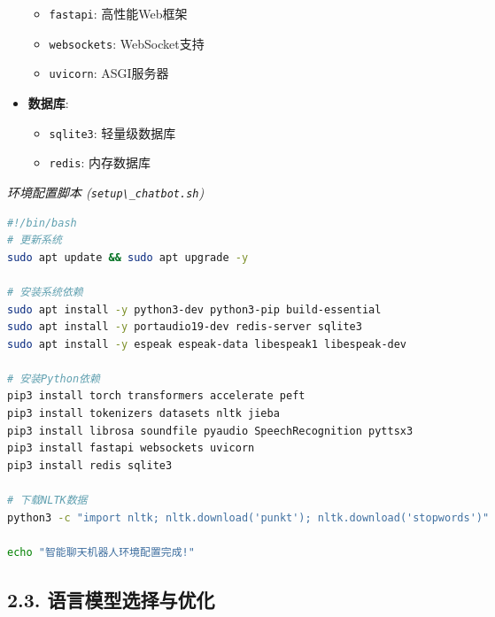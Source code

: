 \begin{itemize}
  \begin{itemize}
  \tightlist
  \item
    \passthrough{\lstinline!fastapi!}: 高性能Web框架
  \item
    \passthrough{\lstinline!websockets!}: WebSocket支持
  \item
    \passthrough{\lstinline!uvicorn!}: ASGI服务器
  \end{itemize}
\item
  \textbf{数据库}:

  \begin{itemize}
  \tightlist
  \item
    \passthrough{\lstinline!sqlite3!}: 轻量级数据库
  \item
    \passthrough{\lstinline!redis!}: 内存数据库
  \end{itemize}
\end{itemize}

\emph{环境配置脚本 (\passthrough{\lstinline!setup\_chatbot.sh!})}

\begin{lstlisting}[language=bash]
#!/bin/bash
# 更新系统
sudo apt update && sudo apt upgrade -y

# 安装系统依赖
sudo apt install -y python3-dev python3-pip build-essential
sudo apt install -y portaudio19-dev redis-server sqlite3
sudo apt install -y espeak espeak-data libespeak1 libespeak-dev

# 安装Python依赖
pip3 install torch transformers accelerate peft
pip3 install tokenizers datasets nltk jieba
pip3 install librosa soundfile pyaudio SpeechRecognition pyttsx3
pip3 install fastapi websockets uvicorn
pip3 install redis sqlite3

# 下载NLTK数据
python3 -c "import nltk; nltk.download('punkt'); nltk.download('stopwords')"

echo "智能聊天机器人环境配置完成!"
\end{lstlisting}

\subsection{2.3.
语言模型选择与优化}\label{ux8bedux8a00ux6a21ux578bux9009ux62e9ux4e0eux4f18ux5316}

